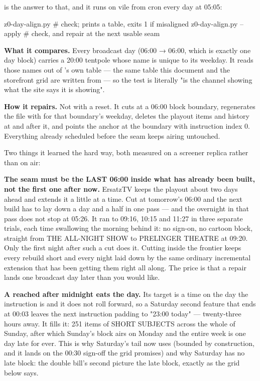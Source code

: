 \documentclass[fontpath=fonts/,logopath=logo/]{riposte-doc}
\begin{document}
 is the answer to that, and it runs on vile from cron every day at 05:05:

z0-day-align.py            \# check; prints a table, exits 1 if misaligned z0-day-align.py --apply    \# check, and repair at the next usable seam

\textbf{What it compares.} Every broadcast day (06:00 → 06:00, which is exactly one day block) carries a 20:00 tentpole whose name is unique to its weekday. It reads those names out of 's own  table — the same table this document and the storefront grid are written from — so the test is literally "is the channel showing what the site says it is showing".

\textbf{How it repairs.} Not with a reset. It cuts at a 06:00 block boundary, regenerates the file with  for that boundary's weekday, deletes the playout items and history at and after it, and points the anchor at the boundary with instruction index 0. Everything already scheduled before the seam keeps airing untouched.

Two things it learned the hard way, both measured on a screener replica rather than on air:

\begin{ripbullets}
\item \textbf{The seam must be the LAST 06:00 inside what has already been built, not the first one after now.} ErsatzTV keeps the playout about two days ahead and extends it a little at a time. Cut at tomorrow's 06:00 and the next build has to lay down a day and a half in one pass — and the overnight  in that pass does not stop at 05:26. It ran to 09:16, 10:15 and 11:27 in three separate trials, each time swallowing the morning behind it: no sign-on, no cartoon block, straight from THE ALL-NIGHT SHOW to PRELINGER THEATRE at 09:20. Only the first night after such a cut does it. Cutting inside the frontier keeps every rebuild short and every night laid down by the same ordinary incremental extension that has been getting them right all along. The price is that a repair lands one broadcast day later than you would like.
\item \textbf{A  reached after midnight eats the day.} Its target is a time on the day the instruction is  and it does not roll forward, so a Saturday second feature that ends at 00:03 leaves the next instruction padding to "23:00 today" — twenty-three hours away. It fills it: 251 items of SHORT SUBJECTS across the whole of Sunday, after which Sunday's block airs on Monday and the entire week is one day late for ever. This is why Saturday's tail now uses  (bounded by construction, and it lands on the 00:30 sign-off the grid promises) and why Saturday has no late block: the double bill's second picture  the late block, exactly as the grid below says.
\end{ripbullets}
\end{document}
